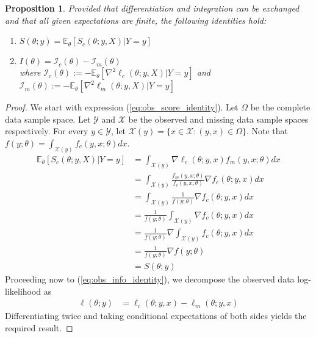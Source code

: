 \documentclass[11pt, oneside]{article}   	%
\newcommand{\bE}{\mathbb{E}}
\newtheorem{proposition}{Proposition}[section]
\begin{document}
\begin{proposition}
    \label{thm2:EM_decomp}
    Provided that differentiation and integration can be exchanged and that all given expectations are finite, the following identities hold:
    \begin{enumerate}[label=(\roman*)]
        \item $S(\theta; y) = \bE_\theta [S_c(\theta; y, X)|Y=y]$ \label{eq:obs_score_identity}
        \item $I(\theta) = \mathcal{I}_c(\theta) - \mathcal{I}_m(\theta)$ \label{eq:obs_info_identity}\\
        where $\mathcal{I}_c(\theta) := - \bE_\theta \left[ \nabla^2 \ell_c(\theta; y, X) | Y=y \right]$ and $\mathcal{I}_m(\theta) := - \bE_\theta \left[ \nabla^2 \ell_m(\theta; y, X) | Y=y \right]$
    \end{enumerate}
\end{proposition}

\begin{proof}
    We start with expression (\ref{eq:obs_score_identity}). Let $\Omega$ be the complete data sample space. Let $\mathcal{Y}$ and $\mathcal{X}$ be the observed and missing data sample spaces respectively. For every $y \in \mathcal{Y}$, let $\mathcal{X}(y) = \{ x \in \mathcal{X}: (y,x) \in \Omega\}$. Note that $f(y; \theta) = \int_{\mathcal{X}(y)} f_c(y, x; \theta) dx$.
    \begin{align}
        \bE_\theta [S_c(\theta; y, X)|Y=y] &= \int_{\mathcal{X}(y)} \nabla \ell_c(\theta; y, x) f_m(y, x; \theta) dx \nonumber\\
        &= \int_{\mathcal{X}(y)} \frac{f_m(y, x; \theta)}{f_c(y, x; \theta)} \nabla f_c(\theta; y, x) dx \nonumber\\
        &= \int_{\mathcal{X}(y)} \frac{1}{f(y; \theta)} \nabla f_c(\theta; y, x) dx\nonumber\\
        &= \frac{1}{f(y; \theta)} \int_{\mathcal{X}(y)} \nabla f_c(\theta; y, x) dx\nonumber\\
        &= \frac{1}{f(y; \theta)} \nabla \int_{\mathcal{X}(y)} f_c(\theta; y, x) dx \nonumber\\
        &= \frac{1}{f(y; \theta)} \nabla f(y; \theta)\nonumber\\
        &= S(\theta; y) \nonumber
    \end{align}
    Proceeding now to (\ref{eq:obs_info_identity}), we decompose the observed data log-likelihood as
    \begin{align*}
        \ell(\theta; y) &= \ell_c(\theta; y, x) - \ell_m(\theta; y, x)
    \end{align*}
    Differentiating twice and taking conditional expectations of both sides yields the required result.
\end{proof}
\end{document}
